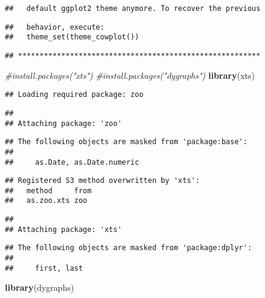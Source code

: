 \documentclass[]{article}
\newenvironment{Shaded}{\begin{snugshade}}{\end{snugshade}}
\newcommand{\CommentTok}[1]{\textcolor[rgb]{0.56,0.35,0.01}{\textit{#1}}}
\newcommand{\KeywordTok}[1]{\textcolor[rgb]{0.13,0.29,0.53}{\textbf{#1}}}
\newcommand{\NormalTok}[1]{#1}
\begin{document}
\begin{verbatim}
##   default ggplot2 theme anymore. To recover the previous
\end{verbatim}

\begin{verbatim}
##   behavior, execute:
##   theme_set(theme_cowplot())
\end{verbatim}

\begin{verbatim}
## ********************************************************
\end{verbatim}

\begin{Shaded}
\begin{Highlighting}[]
\CommentTok{#install.packages("xts")}
\CommentTok{#install.packages("dygraphs")}
\KeywordTok{library}\NormalTok{(xts)}
\end{Highlighting}
\end{Shaded}

\begin{verbatim}
## Loading required package: zoo
\end{verbatim}

\begin{verbatim}
## 
## Attaching package: 'zoo'
\end{verbatim}

\begin{verbatim}
## The following objects are masked from 'package:base':
## 
##     as.Date, as.Date.numeric
\end{verbatim}

\begin{verbatim}
## Registered S3 method overwritten by 'xts':
##   method     from
##   as.zoo.xts zoo
\end{verbatim}

\begin{verbatim}
## 
## Attaching package: 'xts'
\end{verbatim}

\begin{verbatim}
## The following objects are masked from 'package:dplyr':
## 
##     first, last
\end{verbatim}

\begin{Shaded}
\begin{Highlighting}[]
\KeywordTok{library}\NormalTok{(dygraphs)}
\end{Highlighting}
\end{Shaded}
\end{document}
